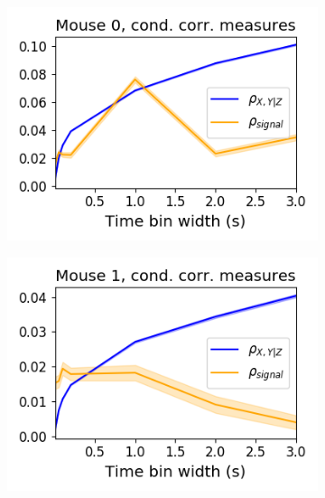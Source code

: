 \documentclass[a4paper,12pt]{article}
\theoremstyle{definition}
\begin{document}
  \begin{figure}[h]
    \begin{subfigure}[h]{0.5\linewidth}
      \includegraphics[width=\linewidth]{figures/Krebs_cond_corr_comparison.png}
      \label{fig:Krebs_cond_corr_comparison}
    \end{subfigure}
    \begin{subfigure}[h]{0.5\linewidth}
      \includegraphics[width=\linewidth]{figures/Waksman_cond_corr_comparison.png}
      \label{fig:Waksman_cond_corr_comparison}
    \end{subfigure}
    \begin{subfigure}[h]{0.5\linewidth}

\end{subfigure}
\end{figure}
\end{document}
